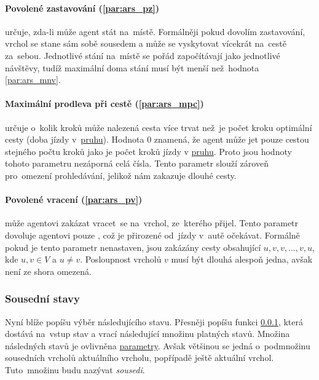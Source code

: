 \paragraph{Povolené zastavování (\ref{par:ars_pz})}
určuje, zda-li může agent stát na~místě.
Formálněji pokud dovolím zastavování, vrchol se stane sám sobě sousedem a může se vyskytovat vícekrát na~cestě za~sebou.
Jednotlivé stání na~místě se pořád započítávají jako jednotlivé návštěvy,
tudíž maximální doma stání musí být menší než~hodnota \ref{par:ars_mnv}.

\paragraph{Maximální prodleva při cestě (\ref{par:ars_mpc})}
určuje o~kolik kroků může nalezená cesta více trvat než~je počet kroku optimální cesty (doba jízdy v~\hyperref[par:pruh]{pruhu}).
Hodnota $0$ znamená, že agent může jet pouze cestou stejného počtu kroků
jako je počet kroků jízdy v \hyperref[par:pruh]{pruhu}.
Proto jsou hodnoty tohoto parametru nezáporná celá čísla.
Tento parametr slouží zároveň pro~omezení prohledávání, jelikož nám zakazuje dlouhé cesty.

\paragraph{Povolené vracení (\ref{par:ars_pv})}
může agentovi zakázat vracet~se na~vrchol, ze~kterého přijel.
Tento parametr dovoluje agentovi pouze , což je přirozené od~jízdy v~autě očekávat.
Formálně pokud je tento parametr nenastaven, jsou zakázány cesty obsahující $u,v,v,\dots,v,u$,
kde $u, v \in V$ a $u \neq v$.
Posloupnost vrcholů $v$ musí být dlouhá alespoň jedna, avšak není ze shora omezená.

\subsubsection{Sousední stavy}\label{subsubsec:sousedni_stavy}

Nyní blíže popíšu výběr následujícího stavu.
Přesněji popíšu funkci \ref{subsubsec:sousedni_stavy},
která dostává na~vstup stav a vrací následující množinu platných stavů.
Množina následných stavů je ovlivněna \hyperref[subsubsec:ars_parametry]{parametry}.
Avšak většinou se jedná o~podmnožinu sousedních vrcholů aktuálního vrcholu, popřípadě ještě aktuální vrchol.
Tuto~množinu budu nazývat \emph{sousedi}.


